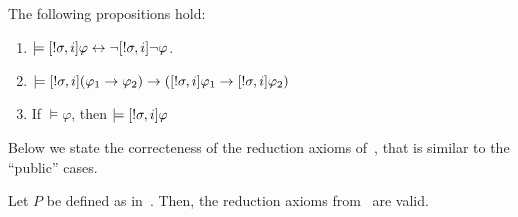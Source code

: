 \begin{proposition} The following propositions hold:
\begin{enumerate}
\item $\models [!\sigma,i]\varphi \leftrightarrow \neg[!\sigma,i]\neg\varphi$. 
\item $\models [!\sigma,i](\varphi_1 \rightarrow \varphi_2) \rightarrow ([!\sigma,i]\varphi_1 \rightarrow [!\sigma,i]\varphi_2)$
\item If $\models \varphi$, then $\models [!\sigma,i]\varphi$
\end{enumerate}
\end{proposition}

Below we state the correcteness of the reduction axioms of~, that is similar to the ``public'' cases.

\begin{proposition}\label{pro:srefgaxioms}
Let $P$ be defined as in~. Then, the reduction axioms from~ are valid.
\end{proposition}
